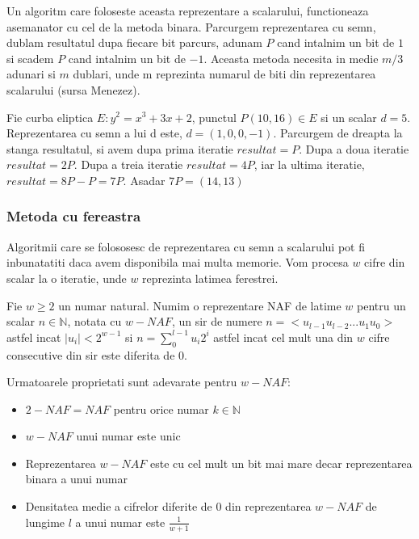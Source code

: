 Un algoritm care foloseste aceasta reprezentare a scalarului, functioneaza asemanator cu cel de la metoda binara. Parcurgem reprezentarea cu semn, dublam resultatul dupa fiecare bit parcurs, adunam $P$ cand intalnim un bit de $1$ si scadem $P$ cand intalnim un bit de $-1$. Aceasta metoda necesita in medie $m/3$ adunari si $m$ dublari, unde m reprezinta numarul de biti din reprezentarea scalarului (sursa Menezez).

\begin{ex}
Fie curba eliptica $E: y^2 = x^3 + 3x + 2$, punctul $P(10, 16)\in E$ si un scalar $d = 5$. Reprezentarea cu semn a lui d este, $d = (1, 0, 0, -1)$. Parcurgem de dreapta la stanga resultatul, si avem dupa prima iteratie $resultat = P$. Dupa a doua iteratie $resultat = 2P$. Dupa a treia iteratie $resultat = 4P$, iar la ultima iteratie, $resultat= 8P - P= 7P$. Asadar $7P = (14, 13)$
\end{ex}

\subsubsection{Metoda cu fereastra}

Algoritmii care se folososesc de reprezentarea cu semn a scalarului pot fi inbunatatiti daca avem disponibila mai multa memorie. Vom procesa $w$ cifre din scalar la o iteratie, unde $w$ reprezinta latimea ferestrei.

\begin{dfn}
Fie $w\geq 2$ un numar natural. Numim o reprezentare NAF de latime $w$ pentru un scalar $n\in\mathbb{N}$, notata cu $w-NAF$, un sir de numere $n = <u_{l-1}u_{l-2}...u_1u_0>$ astfel incat $|u_i| < 2^{w-1}$ si $n = \sum_{0}^{l-1}u_i2^i$ astfel incat cel mult una din $w$ cifre consecutive din sir este diferita de 0.
\end{dfn}

\begin{teo}
Urmatoarele proprietati sunt adevarate pentru $w-NAF$:
\begin{itemize}
\item $2-NAF = NAF$ pentru orice numar $k\in\mathbb{N}$
\item $w-NAF$ unui numar este unic
\item Reprezentarea $w-NAF$ este cu cel mult un bit mai mare decar reprezentarea binara a unui numar
\item Densitatea medie a cifrelor diferite de $0$ din reprezentarea $w-NAF$ de lungime $l$ a unui numar este $\frac{1}{w+1}$
\end{itemize}
\end{teo}

